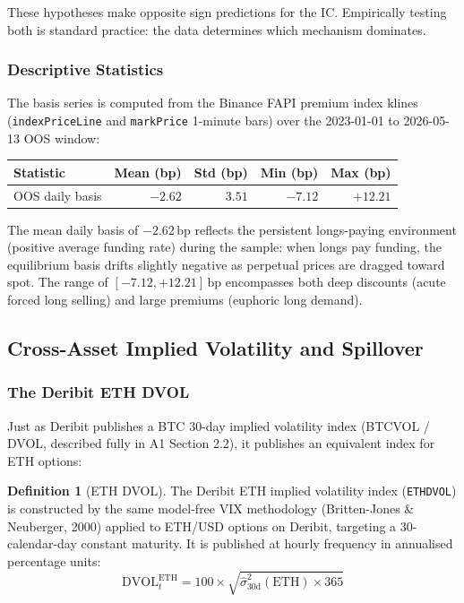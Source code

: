 \documentclass[12pt, a4paper]{article}
\theoremstyle{plain}
\theoremstyle{definition}
\newtheorem{definition}{Definition}[section]
\newcommand{\DVOL}{\mathrm{DVOL}}
\newcommand{\bp}{\,\mathrm{bp}}
\begin{document}
These hypotheses make opposite sign predictions for the IC.  Empirically
testing both is standard practice: the data determines which mechanism
dominates.

\subsubsection{Descriptive Statistics}

The basis series is computed from the Binance FAPI premium index klines
(\texttt{indexPriceLine} and \texttt{markPrice} 1-minute bars) over the
2023-01-01 to 2026-05-13 OOS window:

\begin{center}
\begin{tabular}{lrrrr}
\toprule
Statistic & Mean (bp) & Std (bp) & Min (bp) & Max (bp) \\
\midrule
OOS daily basis & $-2.62$ & $3.51$ & $-7.12$ & $+12.21$ \\
\bottomrule
\end{tabular}
\end{center}

The mean daily basis of $-2.62\bp$ reflects the persistent longs-paying
environment (positive average funding rate) during the sample: when
longs pay funding, the equilibrium basis drifts slightly negative as
perpetual prices are dragged toward spot.  The range of $[-7.12,
+12.21]\bp$ encompasses both deep discounts (acute forced long selling)
and large premiums (euphoric long demand).

\subsection{Cross-Asset Implied Volatility and Spillover}
\label{sec:crossvol_theory}

\subsubsection{The Deribit ETH DVOL}

Just as Deribit publishes a BTC 30-day implied volatility index
(BTCVOL / DVOL, described fully in A1 Section 2.2), it publishes an
equivalent index for ETH options:

\begin{definition}[ETH DVOL]
  The Deribit ETH implied volatility index (\texttt{ETHDVOL}) is
  constructed by the same model-free VIX methodology (Britten-Jones
  \& Neuberger, 2000) applied to ETH/USD options on Deribit, targeting
  a 30-calendar-day constant maturity.  It is published at hourly
  frequency in annualised percentage units:
  \[
    \DVOL^{\mathrm{ETH}}_t = 100 \times \sqrt{\hat{\sigma}^2_{30\mathrm{d}}(\mathrm{ETH}) \times 365}
  \]
\end{definition}
\end{document}
